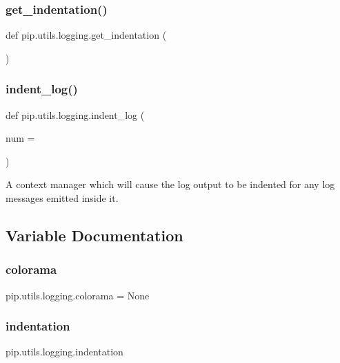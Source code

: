 \subsubsection{\texorpdfstring{get\+\_\+indentation()}{get\_indentation()}}
{\footnotesize\ttfamily def pip.\+utils.\+logging.\+get\+\_\+indentation (\begin{DoxyParamCaption}{ }\end{DoxyParamCaption})}

\mbox{\label{namespacepip_1_1utils_1_1logging_aa1d1a9e2e66e0695b67ff789cbc04e62}} 
\subsubsection{\texorpdfstring{indent\+\_\+log()}{indent\_log()}}
{\footnotesize\ttfamily def pip.\+utils.\+logging.\+indent\+\_\+log (\begin{DoxyParamCaption}\item[{}]{num = {} }\end{DoxyParamCaption})}

\begin{DoxyVerb}A context manager which will cause the log output to be indented for any
log messages emitted inside it.
\end{DoxyVerb}
 

\subsection{Variable Documentation}
\mbox{\label{namespacepip_1_1utils_1_1logging_a6ca18eef2480c37568fdc6c23fb94cd2}} 
\subsubsection{\texorpdfstring{colorama}{colorama}}
{\footnotesize\ttfamily pip.\+utils.\+logging.\+colorama = None}

\mbox{\label{namespacepip_1_1utils_1_1logging_ab26b178c5bcbfb8dd41c500dd7ba9c07}} 
\subsubsection{\texorpdfstring{indentation}{indentation}}
{\footnotesize\ttfamily pip.\+utils.\+logging.\+indentation}

